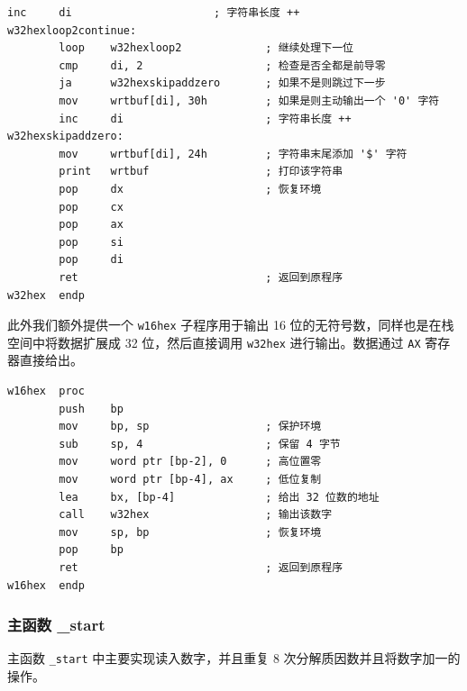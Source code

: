 \begin{lstlisting}[language={[x86masm]Assembler},morekeywords={}]
        inc     di                      ; 字符串长度 ++
w32hexloop2continue:
        loop    w32hexloop2             ; 继续处理下一位
        cmp     di, 2                   ; 检查是否全都是前导零
        ja      w32hexskipaddzero       ; 如果不是则跳过下一步
        mov     wrtbuf[di], 30h         ; 如果是则主动输出一个 '0' 字符
        inc     di                      ; 字符串长度 ++
w32hexskipaddzero:
        mov     wrtbuf[di], 24h         ; 字符串末尾添加 '$' 字符
        print   wrtbuf                  ; 打印该字符串
        pop     dx                      ; 恢复环境
        pop     cx
        pop     ax
        pop     si
        pop     di
        ret                             ; 返回到原程序
w32hex  endp
\end{lstlisting}

此外我们额外提供一个 \verb|w16hex| 子程序用于输出 16 位的无符号数，同样也是在栈空间中将数据扩展成 32 位，然后直接调用 \verb|w32hex| 进行输出。数据通过 \verb|AX| 寄存器直接给出。

\begin{lstlisting}[language={[x86masm]Assembler},morekeywords={}]
w16hex  proc
        push    bp
        mov     bp, sp                  ; 保护环境
        sub     sp, 4                   ; 保留 4 字节
        mov     word ptr [bp-2], 0      ; 高位置零
        mov     word ptr [bp-4], ax     ; 低位复制
        lea     bx, [bp-4]              ; 给出 32 位数的地址
        call    w32hex                  ; 输出该数字
        mov     sp, bp                  ; 恢复环境
        pop     bp
        ret                             ; 返回到原程序
w16hex  endp
\end{lstlisting}

\subsubsection{主函数 \_start}

主函数 \verb|_start| 中主要实现读入数字，并且重复 8 次分解质因数并且将数字加一的操作。

